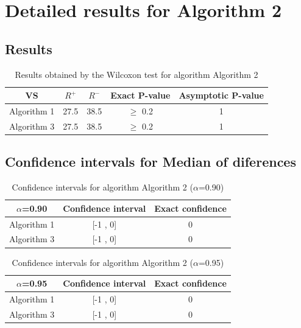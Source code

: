 \documentclass[a4paper,10pt]{article}
\begin{document}
 \clearpage 


\section{Detailed results for Algorithm 2}


\subsection{Results}

\begin{table}[!htp]
\centering\small
\begin{tabular}{
|c|c|c|c|c|}
\hline
 VS & $R^{+}$ & $R^{-}$ & Exact P-value & Asymptotic P-value \\ \hline 
Algorithm 1 & 27.5 & 38.5 & $\geq$ 0.2 & 1\\ \hline 
Algorithm 3 & 27.5 & 38.5 & $\geq$ 0.2 & 1\\ \hline 

\end{tabular}
\caption{Results obtained by the Wilcoxon test for algorithm Algorithm 2}
\end{table}

\subsection{Confidence intervals for Median of diferences}

\begin{table}[!htp]
\centering\small
\begin{tabular}{
|c|c|c|}
\hline
 $\alpha$=0.90 & Confidence interval & Exact confidence \\ \hline 
Algorithm 1 & [-1 , 0] & 0\\ \hline 
Algorithm 3 & [-1 , 0] & 0\\ \hline 

\end{tabular}
\caption{Confidence intervals for algorithm Algorithm 2 ($\alpha$=0.90)}
\end{table}
\begin{table}[!htp]
\centering\small
\begin{tabular}{
|c|c|c|}
\hline
 $\alpha$=0.95 & Confidence interval & Exact confidence \\ \hline 
Algorithm 1 & [-1 , 0] & 0\\ \hline 
Algorithm 3 & [-1 , 0] & 0\\ \hline 

\end{tabular}
\caption{Confidence intervals for algorithm Algorithm 2 ($\alpha$=0.95)}
\end{table}
\end{document}
